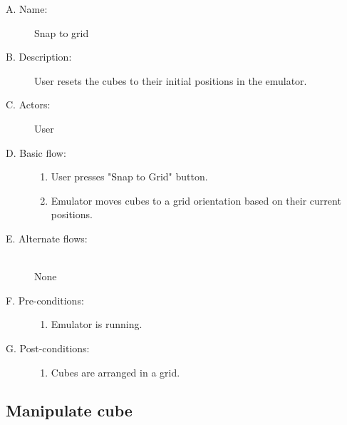 \documentclass[12pt]{article}
\begin{document}
    \begin{description}
      \item[A. Name:] Snap to grid
      \item[B. Description:] User resets the cubes to their initial positions in the emulator.
      \item[C. Actors:] User
      \item[D. Basic flow:] \hfill
        \begin{enumerate}
	  \item{User presses "Snap to Grid" button.}
	  \item{Emulator moves cubes to a grid orientation based on their current positions.}
        \end{enumerate}
      \item[E. Alternate flows:] \hfill \\
	None	
      \item[F. Pre-conditions:] \hfill
        \begin{enumerate}
	  \item{Emulator is running.}
        \end{enumerate}
      \item[G. Post-conditions:] \hfill
        \begin{enumerate}
	  \item{Cubes are arranged in a grid.}
        \end{enumerate}
    \end{description}

  \subsection{Manipulate cube}
\end{document}
